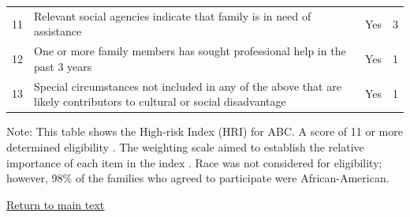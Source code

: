 \documentclass[static]{JJH-Beamer}
\begin{document}
\begin{frame}
\begin{table}[H]
\begin{center}
{\begin{tabular}{c L{8cm} c c}
11	& Relevant social agencies indicate that family is in need of assistance & Yes & 3 \\
12 	& One or more family members has sought professional help in the past 3 years & Yes & 1 \\
13	& Special circumstances not included in any of the above that are likely contributors	to cultural or social disadvantage & Yes & 1 \\
\bottomrule
\end{tabular}
}
\end{center}
\flushleft \tiny
Note: This table shows the High-risk Index (HRI) for ABC. A score of 11 or more determined eligibility \citep{Ramey_Smith_1977_AJMD, Ramey_Campbell_1984_AJMD,Ramey_Campbell_1991_childreninpoverty,Ramey_Campbell_etal_2000_ADS}. The weighting scale aimed to establish the relative importance of each item in the index \citep{Ramey_Smith_1977_AJMD}. Race was not  considered for eligibility; however, 98\% of the families who agreed to participate were African-American\citep{Ramey_Smith_1977_AJMD,Ramey_Campbell_1979_SR}.
\end{table}

\end{frame}

\begin{frame}
 \addtocounter{framenumber}{-1}

\begin{center}
\hyperlink{ret:chocohocochip}{\underline{Return to main text}}
\end{center}

\end{frame}

\clearpage
\end{document}
